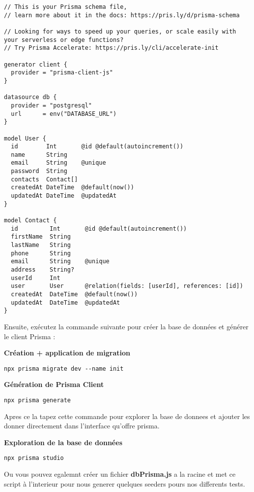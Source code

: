 \documentclass{article}
\begin{document}
\begin{lstlisting}[language=prisma]
// This is your Prisma schema file,
// learn more about it in the docs: https://pris.ly/d/prisma-schema

// Looking for ways to speed up your queries, or scale easily with your serverless or edge functions?
// Try Prisma Accelerate: https://pris.ly/cli/accelerate-init

generator client {
  provider = "prisma-client-js"
}

datasource db {
  provider = "postgresql"
  url      = env("DATABASE_URL")
}

model User {
  id        Int       @id @default(autoincrement())
  name      String   
  email     String    @unique 
  password  String    
  contacts  Contact[] 
  createdAt DateTime  @default(now()) 
  updatedAt DateTime  @updatedAt 
}

model Contact {
  id         Int       @id @default(autoincrement())
  firstName  String   
  lastName   String    
  phone      String    
  email      String    @unique 
  address    String?   
  userId     Int       
  user       User      @relation(fields: [userId], references: [id]) 
  createdAt  DateTime  @default(now()) 
  updatedAt  DateTime  @updatedAt
}
\end{lstlisting}

Ensuite, exécutez la commande suivante pour créer la base de données et générer le client Prisma :

    \item \textbf{ Création + application de migration}
    \begin{lstlisting}[style=custombash]
    npx prisma migrate dev --name init
    \end{lstlisting}
    
      \item \textbf{Génération de Prisma Client}
    \begin{lstlisting}[style=custombash]
    npx prisma generate
    \end{lstlisting}

    
Apres ce la tapez cette commande pour explorer la base de donnees et ajouter les donner directement dans l'interface qu'offre prisma.
    \item \textbf{Exploration de la base de données}
    \begin{lstlisting}[style=custombash]
    npx prisma studio
    \end{lstlisting}


Ou vous pouvez egalemnt  créer un fichier \textbf{dbPrisma.js} a la racine et met ce script à l'interieur pour nous generer quelques seeders pours nos differents tests.
\end{document}
